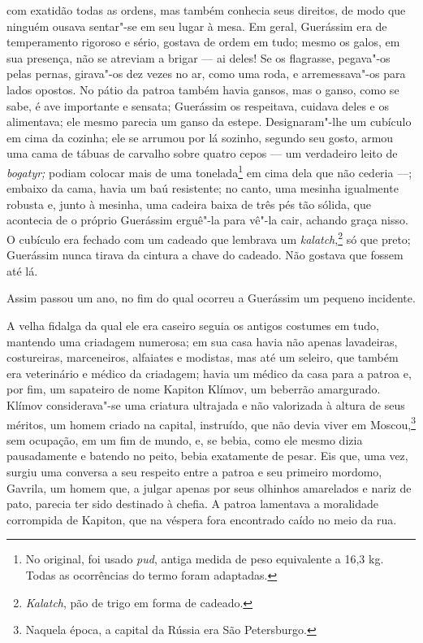 com exatidão todas as ordens, mas também conhecia seus direitos, de modo
que ninguém ousava sentar"-se em seu lugar à mesa. Em geral, Guerássim
era de temperamento rigoroso e sério, gostava de ordem em tudo; mesmo os
galos, em sua presença, não se atreviam a brigar --- ai deles! Se os
flagrasse, pegava"-os pelas pernas, girava"-os dez vezes no ar, como uma
roda, e arremessava"-os para lados opostos. No pátio da patroa também
havia gansos, mas o ganso, como se sabe, é ave importante e sensata;
Guerássim os respeitava, cuidava deles e os alimentava; ele mesmo
parecia um ganso da estepe. Designaram"-lhe um cubículo em cima da
cozinha; ele se arrumou por lá sozinho, segundo seu gosto, armou uma
cama de tábuas de carvalho sobre quatro cepos --- um verdadeiro leito de
\emph{bogatyr;} podiam colocar mais de uma tonelada\footnote{No
  original, foi usado \emph{pud}, antiga medida de peso equivalente a
  16,3 kg. Todas as ocorrências do termo foram adaptadas.} em cima dela
que não cederia ---; embaixo da cama, havia um baú resistente; no canto,
uma mesinha igualmente robusta e, junto à mesinha, uma cadeira baixa de
três pés tão sólida, que acontecia de o próprio Guerássim erguê"-la para
vê"-la cair, achando graça nisso. O cubículo era fechado com um cadeado
que lembrava um \emph{kalatch},\footnote{\emph{Kalatch}, pão de trigo
  em forma de cadeado.} só que preto; Guerássim nunca tirava da
cintura a chave do cadeado. Não gostava que fossem até lá.

Assim passou um ano, no fim do qual ocorreu a Guerássim um pequeno
incidente.

A velha fidalga da qual ele era caseiro seguia os antigos costumes em
tudo, mantendo uma criadagem numerosa; em sua casa havia não apenas
lavadeiras, costureiras, marceneiros, alfaiates e modistas, mas até um
seleiro, que também era veterinário e médico da criadagem; havia um
médico da casa para a patroa e, por fim, um sapateiro de nome Kapiton
Klímov, um beberrão amargurado. Klímov considerava"-se uma criatura
ultrajada e não valorizada à altura de seus méritos, um homem criado na
capital, instruído, que não devia viver em Moscou,\footnote{Naquela
  época, a capital da Rússia era São Petersburgo.} sem ocupação, em um
fim de mundo, e, se bebia, como ele mesmo dizia pausadamente e batendo
no peito, bebia exatamente de pesar. Eis que, uma vez, surgiu uma
conversa a seu respeito entre a patroa e seu primeiro mordomo, Gavrila,
um homem que, a julgar apenas por seus olhinhos amarelados e nariz de
pato, parecia ter sido destinado à chefia. A patroa lamentava a
moralidade corrompida de Kapiton, que na véspera fora encontrado caído
no meio da rua.

